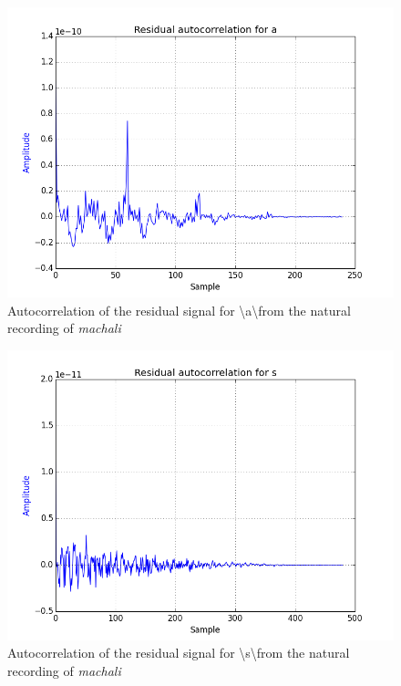 \documentclass[a4paper]{article}
\begin{document}
\begin{figure}[h!]
    \includegraphics[width=\linewidth]{./images/res_autocorr_a.png}
    \caption{Autocorrelation of the residual signal for  \textbackslash a\textbackslash from the natural recording of \textit{machali}}
    \label{fig:1}
\end{figure}


\begin{figure}[h!]
    \includegraphics[width=\linewidth]{./images/res_autocorr_s.png}
    \caption{Autocorrelation of the residual signal for \textbackslash s\textbackslash from the natural recording of \textit{machali}}
    \label{fig:1}
\end{figure}
\end{document}
